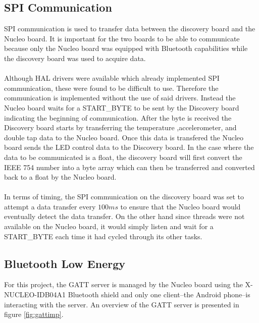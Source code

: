 \documentclass[12pt]{article}
\begin{document}
\subsection{SPI Communication}
SPI communication is used to transfer data between the discovery board and the Nucleo board. It is important for the two boards to be able to communicate because only the Nucleo board was equipped with Bluetooth capabilities while the discovery board was used to acquire data.
\paragraph{}
Although HAL drivers were available which already implemented SPI communication, these were found to be difficult to use. Therefore the communication is implemented without the use of said drivers. Instead the Nucleo board waits for a START\_BYTE to be sent by the Discovery board indicating the beginning of communication. After the byte is received the Discovery board starts by transferring the temperature ,accelerometer, and double tap data to the Nucleo board. Once this data is transfered the Nucleo board sends the LED control data to the Discovery board. In the case where the data to be communicated is a float, the discovery board will first convert the IEEE 754 number into a byte array which can then be transferred and converted back to a float by the Nucleo board.
\paragraph{}
In terms of timing, the SPI communication on the discovery board was set to attempt a data transfer every $100 ms$ to ensure that the Nucleo board would eventually detect the data transfer. On the other hand since threads were not available on the Nucleo board, it would simply listen and wait for a START\_BYTE each time it had cycled through its other tasks.

\subsection{Bluetooth Low Energy}
For this project, the GATT server is managed by the Nucleo board using the X-NUCLEO-IDB04A1 Bluetooth shield and only one client--the Android phone--is interacting with the server. An overview of the GATT server is presented in figure \ref{fig:gattimp}.
\paragraph{}
\end{document}
